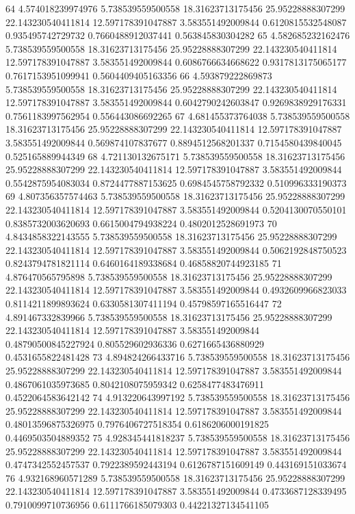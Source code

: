 {64 4.574018239974976 5.738539559500558 18.31623713175456 25.95228888307299 22.143230540411814 12.597178391047887 3.583551492009844 0.6120815532548087 0.935495742729732 0.7660488912037441 0.563845830304282
65 4.582685232162476 5.738539559500558 18.31623713175456 25.95228888307299 22.143230540411814 12.597178391047887 3.583551492009844 0.6086766634668622 0.9317813175065177 0.7617153951099941 0.5604409405163356
66 4.593879222869873 5.738539559500558 18.31623713175456 25.95228888307299 22.143230540411814 12.597178391047887 3.583551492009844 0.6042790242603847 0.9269838929176331 0.7561183997562954 0.556443086692265
67 4.681455373764038 5.738539559500558 18.31623713175456 25.95228888307299 22.143230540411814 12.597178391047887 3.583551492009844 0.569874107837677 0.8894512568201337 0.7154580439840045 0.525165889944349
68 4.721130132675171 5.738539559500558 18.31623713175456 25.95228888307299 22.143230540411814 12.597178391047887 3.583551492009844 0.5542875954083034 0.8724477887153625 0.6984545758792332 0.510996333190373
69 4.807356357574463 5.738539559500558 18.31623713175456 25.95228888307299 22.143230540411814 12.597178391047887 3.583551492009844 0.5204130070550101 0.8385732003620693 0.6615004794938224 0.4802012528691973
70 4.8434858322143555 5.738539559500558 18.31623713175456 25.95228888307299 22.143230540411814 12.597178391047887 3.583551492009844 0.5062192848750523 0.8243794781821114 0.6460164189338684 0.46858820744923185
71 4.876470565795898 5.738539559500558 18.31623713175456 25.95228888307299 22.143230540411814 12.597178391047887 3.583551492009844 0.4932609966823033 0.8114211899893624 0.6330581307411194 0.45798597165516447
72 4.891467332839966 5.738539559500558 18.31623713175456 25.95228888307299 22.143230540411814 12.597178391047887 3.583551492009844 0.48790500845227924 0.805529602936336 0.6271665436880929 0.4531655822481428
73 4.894824266433716 5.738539559500558 18.31623713175456 25.95228888307299 22.143230540411814 12.597178391047887 3.583551492009844 0.4867061035973685 0.8042108075959342 0.6258477483476911 0.4522064583642142
74 4.913220643997192 5.738539559500558 18.31623713175456 25.95228888307299 22.143230540411814 12.597178391047887 3.583551492009844 0.48013596875326975 0.7976406727518354 0.6186206000191825 0.4469503504889352
75 4.928345441818237 5.738539559500558 18.31623713175456 25.95228888307299 22.143230540411814 12.597178391047887 3.583551492009844 0.4747342552457537 0.7922389592443194 0.6126787151609149 0.443169151033674
76 4.932168960571289 5.738539559500558 18.31623713175456 25.95228888307299 22.143230540411814 12.597178391047887 3.583551492009844 0.4733687128339495 0.7910099710736956 0.6111766185079303 0.44221327134541105
}
